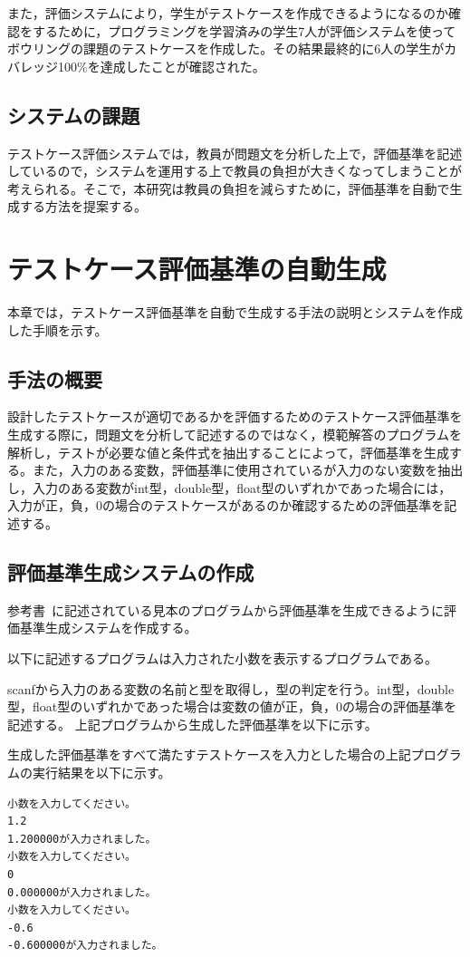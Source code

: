 \documentclass{tpu-sotu}
\begin{document}
また，評価システムにより，学生がテストケースを作成できるようになるのか確認をするために，プログラミングを学習済みの学生7人が評価システムを使ってボウリングの課題のテストケースを作成した。その結果最終的に6人の学生がカバレッジ100\%を達成したことが確認された。
\section{システムの課題}
テストケース評価システムでは，教員が問題文を分析した上で，評価基準を記述しているので，システムを運用する上で教員の負担が大きくなってしまうことが考えられる。そこで，本研究は教員の負担を減らすために，評価基準を自動で生成する方法を提案する。
\chapter{テストケース評価基準の自動生成}
本章では，テストケース評価基準を自動で生成する手法の説明とシステムを作成した手順を示す。
\section{手法の概要}
設計したテストケースが適切であるかを評価するためのテストケース評価基準を生成する際に，問題文を分析して記述するのではなく，模範解答のプログラムを解析し，テストが必要な値と条件式を抽出することによって，評価基準を生成する。また，入力のある変数，評価基準に使用されているが入力のない変数を抽出し，入力のある変数がint型，double型，float型のいずれかであった場合には，入力が正，負，0の場合のテストケースがあるのか確認するための評価基準を記述する。
\section{評価基準生成システムの作成}
参考書~\cite{b1}に記述されている見本のプログラムから評価基準を生成できるように評価基準生成システムを作成する。

以下に記述するプログラムは入力された小数を表示するプログラムである。

scanfから入力のある変数の名前と型を取得し，型の判定を行う。int型，double型，float型のいずれかであった場合は変数の値が正，負，0の場合の評価基準を記述する。
上記プログラムから生成した評価基準を以下に示す。

生成した評価基準をすべて満たすテストケースを入力とした場合の上記プログラムの実行結果を以下に示す。
\begin{lstlisting}[xleftmargin=1cm]
小数を入力してください。
1.2
1.200000が入力されました。
小数を入力してください。
0
0.000000が入力されました。
小数を入力してください。
-0.6
-0.600000が入力されました。
\end{lstlisting}
\end{document}
